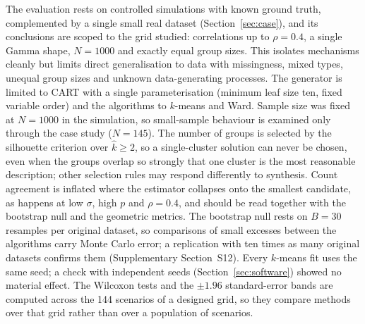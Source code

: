 \documentclass[pdflatex,referee]{sn-jnl}
\begin{document}
The evaluation rests on controlled simulations with known ground truth,
complemented by a single small real dataset (Section~\ref{sec:case}), and its
conclusions are scoped to the grid studied: correlations up
to $\rho = 0.4$, a single Gamma shape, $N = 1000$ and exactly equal group
sizes. This isolates mechanisms cleanly but limits direct generalisation to
data with missingness, mixed types, unequal group sizes and unknown
data-generating processes. The generator is limited to CART with a single
parameterisation (minimum leaf size ten, fixed variable order) and the
algorithms to $k$-means and Ward. Sample size was fixed at $N = 1000$ in the
simulation, so small-sample behaviour is examined only through the case study
($N = 145$). The number of groups is selected by the
silhouette criterion over $\hat{k} \ge 2$, so a single-cluster solution can
never be chosen, even when the groups overlap so strongly that one cluster is
the most reasonable description; other selection rules \citep{milligan1985}
may respond differently to synthesis. Count agreement is inflated where the
estimator collapses onto the smallest candidate, as happens at low $\sigma$,
high $p$ and $\rho = 0.4$, and should be read together with the bootstrap null
and the geometric metrics. The bootstrap null rests on $B = 30$ resamples per
original dataset, so comparisons of small excesses between the algorithms
carry Monte Carlo error; a replication with ten times as many original datasets
confirms them (Supplementary Section~S12). Every $k$-means fit uses the same seed; a check with
independent seeds (Section~\ref{sec:software}) showed no material effect. The Wilcoxon tests
and the $\pm 1.96$ standard-error bands are computed across the 144 scenarios
of a designed grid, so they compare methods over that grid rather than over a
population of scenarios.
\end{document}
